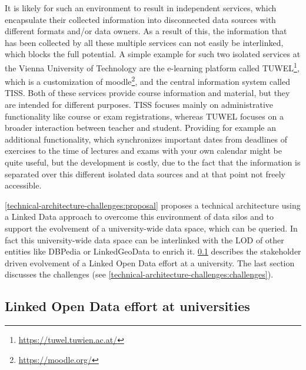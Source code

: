 \documentclass{article}
\begin{document}
It is likely for such an environment to result in independent services, which encapsulate their collected information into disconnected data sources with different formats and/or data owners. As a result of this, the information that has been collected by all these multiple services can not easily be interlinked, which blocks the full potential. A simple example for such two isolated services at the Vienna University of Technology are the e-learning platform called TUWEL\footnote{\url{https://tuwel.tuwien.ac.at/}}, which is a customization of moodle\footnote{\url{https://moodle.org/}}, and the central information system called TISS. Both of these services provide course information and material, but they are intended for different purposes. TISS focuses mainly on administrative functionality like course or exam registrations, whereas TUWEL focuses on a broader interaction between teacher and student. Providing for example an additional functionality, which synchronizes important dates from deadlines of exercises to the time of lectures and exams with your own calendar might be quite useful, but the development is costly, due to the fact that the information is separated over this different isolated data sources and at that point not freely accessible. 

\ref{technical-architecture-challenges:proposal} proposes a technical architecture using a Linked Data approach to overcome this environment of data silos and to support the evolvement of a university-wide data space, which can be queried. In fact this university-wide data space can be interlinked with the LOD of other entities like DBPedia or LinkedGeoData to enrich it. \ref{technical-architecture-challenges:lod-effort} describes the stakeholder driven evolvement of a Linked Open Data effort at a university. The last section discusses the challenges (see \ref{technical-architecture-challenges:challenges}).

\subsection{Linked Open Data effort at universities}
\label{technical-architecture-challenges:lod-effort}
\end{document}
